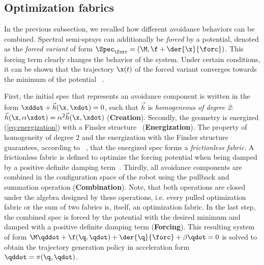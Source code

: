 \subsection{Optimization fabrics}%
\label{sub:optimization_fabrics}
%
In the previous subsection, we recalled how different avoidance behaviors can
be combined. Spectral semi-sprays can additionally be \textit{forced} by a
potential, denoted as the \textit{forced variant} of form $\Spec_{\forc} =
\left(\M,\f + \der{\x}{\forc}\right)$. This forcing term clearly changes the
behavior of the system. Under certain conditions, it can be
shown that the trajectory $\x(t)$ of the forced variant converges towards the minimum of the potential \forc{}~\cite{Ratliff2020}.

First, the initial spec that represents an avoidance
component is written in the form $\xddot + \vec{h}(\x,\xdot)
= 0$, such that $\vec{h}$ is \textit{homogeneous of degree
2}: $\vec{h}(\x,\alpha\xdot) = \alpha^2\vec{h}(\x,\xdot)$
(\textbf{Creation}). Secondly, the geometry is energized
(\cref{eq:energization}) with a Finsler
structure~\cite[Definition 5.4]{Ratliff2020}
(\textbf{Energization}). The property of homogeneity of
degree 2 and the energization with the Finsler structure
guarantees, according to ~\cite[Theorem 4.29]{Ratliff2020},
that the energized spec forms a \textit{frictionless
fabric}. A frictionless fabric is defined to optimize the
forcing potential \forc{} when being damped by a positive
definite damping term~\cite[Definition 4.4]{Ratliff2020}.
Thirdly, all avoidance components are combined in the
configuration space of the robot using the pullback and
summation operation (\textbf{Combination}). Note, that both
operations are closed under the algebra designed by these
operations, i.e. every pulled optimization fabric or the sum
of two \ac{fabrics} is, itself, an optimization fabric. In
the last step, the combined spec is forced by the potential
\forc{} with the desired minimum and damped with a positive
definite damping term (\textbf{Forcing}). This resulting
system of form $\M\qddot + \f(\q, \qdot) + \der{\q}{\forc} +
\beta\qdot = 0$ is solved to obtain the trajectory
generation policy in acceleration form $\qddot = \pi(\q,\qdot)$.

